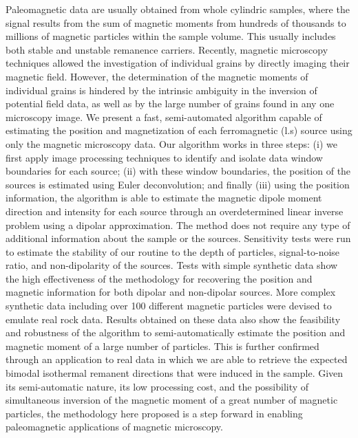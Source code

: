 Paleomagnetic data are usually obtained from whole cylindric samples, where the signal results from the sum of magnetic moments from hundreds of thousands to millions of magnetic particles within the sample volume. 
This usually includes both stable and unstable remanence carriers.
Recently, magnetic microscopy techniques allowed the investigation of individual grains by directly imaging their magnetic field. 
However, the determination of the magnetic moments of individual grains is hindered by the intrinsic ambiguity in the inversion of potential field data, as well as by the large number of grains found in any one microscopy image. 
We present a fast, semi-automated algorithm capable of estimating the position and magnetization of each ferromagnetic (l.s) source using only the magnetic microscopy data. 
Our algorithm works in three steps: (i) we first apply image processing techniques to identify and isolate data window boundaries for each source; (ii) with these window boundaries, the position of the sources is estimated using Euler deconvolution; and finally (iii) using the  position information, the algorithm is able to estimate the magnetic dipole moment direction and intensity for each source through an overdetermined linear inverse problem using a dipolar approximation. 
The method does not require any type of additional information about the sample or the sources. 
Sensitivity tests were run to estimate the stability of our routine to the depth of particles, signal-to-noise ratio, and non-dipolarity of the sources. 
Tests with simple synthetic data show the high effectiveness of the methodology for recovering the position and magnetic information for both dipolar and non-dipolar sources. 
More complex synthetic data including over 100 different magnetic particles were devised to emulate real rock data. 
Results obtained on these data also show the feasibility and robustness of the algorithm to semi-automatically estimate the position and magnetic moment of a large number of particles. 
This is further confirmed through an application to real data in which we are able to retrieve the expected bimodal isothermal remanent directions that were induced in the sample. 
Given its semi-automatic nature, its low processing cost, and the possibility of simultaneous inversion of the magnetic moment of a great number of magnetic particles, the methodology here proposed is a step forward in enabling paleomagnetic applications of magnetic microscopy.